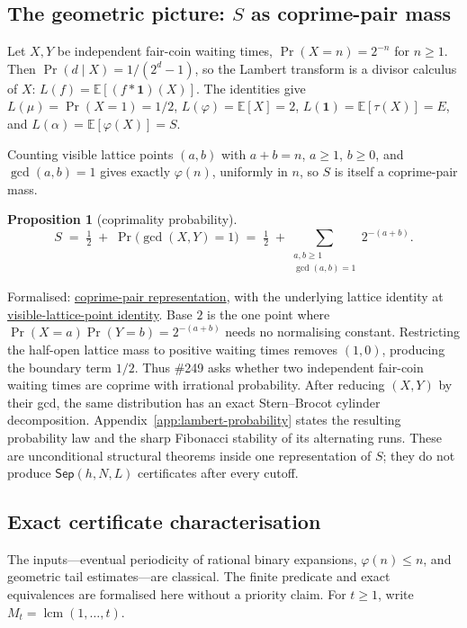 \documentclass[11pt]{article}
\newcommand{\commit}{bb4e24651b37cd096d3749ef299c3317930b3a3b}
\newcommand{\repobase}{https://github.com/wcook04/plectis-lean-erdos249-257/blob/\commit}
\newcommand{\PK}{Erdos249257}
\newcommand{\lword}[4]{\href{\repobase/\PK/#1\#L#2}{#4}}
\newtheorem{proposition}[theorem]{Proposition}
\theoremstyle{definition}
\theoremstyle{remark}
\newcommand{\ph}{\varphi}
\newcommand{\lcm}{\operatorname{lcm}}
\begin{document}
\subsection{The geometric picture: $S$ as coprime-pair mass}\label{sec:geom}

Let $X,Y$ be independent fair-coin waiting times, $\Pr(X=n)=2^{-n}$ for $n\ge1$.
Then $\Pr(d\mid X)=1/(2^d-1)$, so the Lambert transform is a divisor calculus of
$X$: $L(f)=\mathbb E[(f*\mathbf 1)(X)]$.  The identities give $L(\mu)=\Pr(X=1)=1/2$,
$L(\ph)=\mathbb E[X]=2$, $L(\mathbf 1)=\mathbb E[\tau(X)]=E$, and
$L(\alpha)=\mathbb E[\ph(X)]=S$.

Counting visible lattice points $(a,b)$ with $a+b=n$, $a\ge1$, $b\ge0$, and $\gcd(a,b)=1$ gives
exactly $\ph(n)$, uniformly in $n$, so $S$ is itself a coprime-pair mass.

\begin{proposition}[coprimality probability]\label{res:coprime}
\[
S \;=\; \tfrac12 \;+\; \Pr\!\big(\gcd(X,Y)=1\big)
\;=\; \tfrac12 \;+\!\!\sum_{\substack{a,b\ge1\\ \gcd(a,b)=1}}\!\! 2^{-(a+b)}.
\]
\end{proposition}
\noindent Formalised: \lword{CertificateKernel.lean}{18557}{totient_series_eq_half_add_visible_coprime_pairs}{coprime-pair representation},
with the underlying lattice identity at
\lword{CertificateKernel.lean}{18544}{tsum_visible_coprime_pairs_eq_totient_series}{visible-lattice-point identity}.
Base $2$ is the one point where $\Pr(X=a)\Pr(Y=b)=2^{-(a+b)}$ needs no normalising
constant.  Restricting the half-open lattice mass to positive waiting times
removes $(1,0)$, producing the boundary term $1/2$.  Thus \#249 asks whether two independent
fair-coin waiting times are coprime with irrational probability.
After reducing $(X,Y)$ by their gcd, the same distribution has an exact
Stern--Brocot cylinder decomposition.
Appendix~\ref{app:lambert-probability} states the resulting probability law
and the sharp Fibonacci stability of its alternating runs.  These are
unconditional structural theorems inside one representation of \(S\); they
do not produce \(\mathsf{Sep}(h,N,L)\) certificates after every cutoff.

\subsection{Exact certificate characterisation}\label{sec:reduction}

The inputs---eventual periodicity of rational binary expansions,
$\ph(n)\le n$, and geometric tail estimates---are classical.  The finite
predicate and exact equivalences are formalised here without a priority claim.
For $t\ge1$, write $M_t=\lcm(1,\ldots,t)$.
\end{document}
